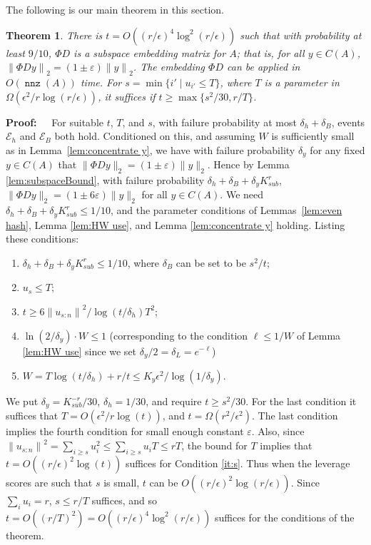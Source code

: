 \documentclass{sig-alternate}
\newcommand{\norm}[1]{{\| #1 \|}}
\newcommand{\cE}{\mathcal{E}}
\DeclareMathOperator{\nnz}{\mathtt{nnz}}
\newcommand\scn{_{s:n}}
\newcommand{\eps}{\varepsilon}
\newtheorem{theorem}{Theorem}
\def\FullBox{\hbox{\vrule width 8pt height 8pt depth 0pt}}
\def\qed{\ifmmode\qquad\FullBox\else{\unskip\nobreak\hfil
\penalty50\hskip1em\null\nobreak\hfil\FullBox
\parfillskip=0pt\finalhyphendemerits=0\endgraf}\fi}
\newenvironment{proof}{\begin{trivlist} \item {\bf Proof:~~}}
  {\qed\end{trivlist}}
\begin{document}
\fi The following is our main theorem in this section. 
\begin{theorem}\label{thm:main}
There is  $t=O((r/\epsilon)^4\log^2(r/\epsilon))$ such that with probability at least $9/10$,
$\Phi D$ is a subspace embedding matrix for $A$; that is, for all $y \in C(A)$, 
$\norm{\Phi Dy}_2 = (1 \pm \eps)\norm{y}_2$.  The embedding $\Phi D$ can be applied in $O(\nnz(A))$
time. For $s=\min\{i' \mid u_{i'}\le T\}$, where $T$ is a parameter in $\Omega(\epsilon^2/r\log(r/\epsilon))$,
it suffices if $t \ge \max\{s^2/30, r/T\}$.
\end{theorem}
\begin{proof}
For suitable $t$, $T$, and $s$,
with failure probability at most $\delta_h + \delta_B$, events $\cE_h$ and $\cE_B$ both hold.
Conditioned on this, and assuming $W$ is sufficiently small as in Lemma~\ref{lem:concentrate y},
we have with failure probability $\delta_y$ for any fixed $y\in C(A)$ that $\|\Phi D y\|_2 = (1 \pm \eps)\|y\|_2$.
Hence by Lemma \ref{lem:subspaceBound}, with failure probability
$\delta_h + \delta_B + \delta_y K_{sub}^r$, 
$\|\Phi Dy\|_2 = (1 \pm 6\eps) \|y\|_2$ for all $y \in C(A)$.
We need $\delta_h + \delta_B + \delta_y K_{sub}^r\le 1/10$, and the parameter conditions of Lemmas~\ref{lem:even hash}, 
Lemma \ref{lem:HW use}, and Lemma \ref{lem:concentrate y} holding. Listing these conditions:
\begin{enumerate}
\item $\delta_h + \delta_B + \delta_y K_{sub}^r \le 1/10$, where $\delta_B$ can be set to be $s^2/t$;
\item $u_s \le T$;
\item \label{it:s} $t \ge 6\norm{u\scn}^2/\log(t/\delta_h)T^2$;
\item $\ln(2/\delta_y) \cdot W \leq 1$ (corresponding to the condition $\ell \leq 1/W$ of Lemma \ref{lem:HW use} 
since we set $\delta_y/2 = \delta_L = e^{-\ell}$)
\item $W = T\log(t/\delta_h) + r/t \le K_y \epsilon^2/\log(1/\delta_y)$.
\end{enumerate}
We put $\delta_y =  K_{sub}^{-r}/30$, $\delta_h = 1/30$, and require $t\ge s^2/30$.
For the last condition it suffices that $T = O(\epsilon^2/r\log(t))$,
and $t = \Omega(r^2/\epsilon^2)$. The last condition implies the fourth condition for small enough constant $\eps$. 
Also, since $\norm{u\scn}^2 = \sum_{i\ge s} u_i^2 \le \sum_{i\ge s} u_i T\le rT$,
the bound for $T$ implies that $t=O((r/\epsilon)^2\log(t))$ suffices for Condition \ref{it:s}.
Thus when the leverage scores are such that
$s$ is small, $t$ can be $O((r/\epsilon)^2\log(r/\epsilon))$.
Since $\sum_i u_i = r$, $s\le r/T$ suffices, and so $t= O((r/T)^2) = O((r/\epsilon)^4\log^2(r/\epsilon))$
suffices for the conditions of the theorem.
\end{proof}
\end{document}
